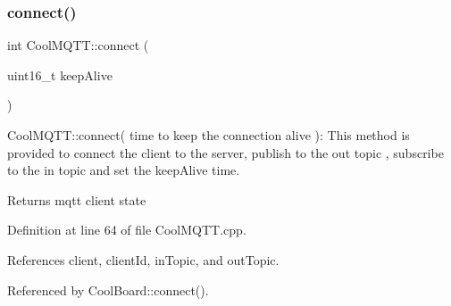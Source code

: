 \subsubsection{\texorpdfstring{connect()}{connect()}}
{\footnotesize\ttfamily int Cool\+M\+Q\+T\+T\+::connect (\begin{DoxyParamCaption}\item[{uint16\+\_\+t}]{keep\+Alive }\end{DoxyParamCaption})}

Cool\+M\+Q\+T\+T\+::connect( time to keep the connection alive )\+: This method is provided to connect the client to the server, publish to the out topic , subscribe to the in topic and set the keep\+Alive time.

\begin{DoxyReturn}{Returns}
mqtt client state 
\end{DoxyReturn}


Definition at line 64 of file Cool\+M\+Q\+T\+T.\+cpp.



References client, client\+Id, in\+Topic, and out\+Topic.



Referenced by Cool\+Board\+::connect().


